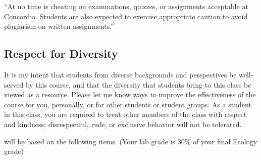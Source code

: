 \documentclass{tufte-handout}
\begin{document}

``At no time is cheating on examinations, quizzes, or assignments acceptable at Concordia. Students are also expected to exercise appropriate caution to avoid plagiarism on written assignments.''

\begin{fullwidth}

\subsection{Respect for Diversity}

It is my intent that students from diverse backgrounds and perspectives be well-served by this course, and that the diversity that students bring to this class be viewed as a resource. Please let me know ways to improve the effectiveness of the course for you, personally, or for other students or student groups. As a student in this class, you are required to treat other members of the class with respect and kindness; disrespectful, rude, or exclusive behavior will not be tolerated.




 will be based on the following items. (Your lab grade is 30\% of your final Ecology grade)	
				


\end{fullwidth}
\end{document}
